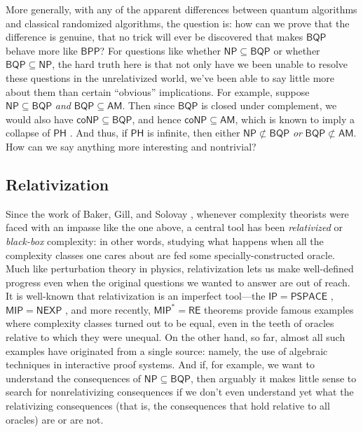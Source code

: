 \documentclass[11pt]{article}%
\begin{document}
More generally, with any of the apparent differences between quantum algorithms and classical randomized algorithms, the question is: how can we prove that the difference is genuine, that no trick will ever be discovered that makes $\mathsf{BQP}$ behave more like $\mathsf{BPP}$? For questions like whether $\mathsf{NP} \subseteq \mathsf{BQP}$ or whether $\mathsf{BQP} \subseteq \mathsf{NP}$, the hard truth here is that not only have we been unable to resolve these questions in the unrelativized world, we've been able to say little more about them than certain ``obvious'' implications.  For example, suppose $\mathsf{NP} \subseteq \mathsf{BQP}$ \textit{and} $\mathsf{BQP} \subseteq \mathsf{AM}$.  Then since $\mathsf{BQP}$ is closed under complement, we would also have $\mathsf{coNP} \subseteq \mathsf{BQP}$, and hence $\mathsf{coNP} \subseteq \mathsf{AM}$, which is known to imply a collapse of $\mathsf{PH}$ \cite{BHZ87}.  And thus, if $\mathsf{PH}$ is infinite, then either $\mathsf{NP} \not\subset \mathsf{BQP}$ \textit{or} $\mathsf{BQP} \not\subset \mathsf{AM}$.  How can we say anything more interesting and nontrivial?

\subsection{Relativization}
Since the work of Baker, Gill, and Solovay \cite{BGS75}, whenever complexity theorists were faced with an impasse like the one above, a central tool has been \textit{relativized} or \textit{black-box} complexity: in other words, studying what happens when all the complexity classes one cares about are fed some specially-constructed oracle.  Much like perturbation theory in physics, relativization lets us make well-defined progress even when the original questions we wanted to answer are out of reach.  It is well-known that relativization is an imperfect tool---the $\mathsf{IP}=\mathsf{PSPACE}$ \cite{Sha92}, $\mathsf{MIP}=\mathsf{NEXP}$ \cite{BFL91}, and more recently, $\mathsf{MIP}^*=\mathsf{RE}$ \cite{JNVWY20} theorems provide famous examples where complexity classes turned out to be equal, even in the teeth of oracles relative to which they were unequal.  On the other hand, so far, almost all such examples have originated from a single source: namely, the use of algebraic techniques in interactive proof systems.  And if, for example, we want to understand the consequences of $\mathsf{NP} \subseteq \mathsf{BQP}$, then arguably it makes little sense to search for nonrelativizing consequences if we don't even understand yet what the relativizing consequences (that is, the consequences that hold relative to all oracles) are or are not.
\end{document}
